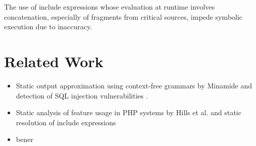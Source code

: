 \documentclass{sig-alternate-05-2015}
\begin{document}
\begin{framed}
\textcolor{RYB1}{The use of include expressions whose evaluation at runtime
involves concatenation, especially of fragments from critical sources, impede
symbolic execution due to inaccuracy.}
\end{framed}





\section{Related Work}
\begin{itemize}
  \item Static output approximation using context-free grammars
  by Minamide \cite{minamide2005static} and detection of SQL
  injection vulnerabilities \cite{wassermann2007sound}.
  \item Static analysis of feature usage in PHP systems by Hills et al.
  \cite{Hills:2013:ESP:2483760.2483786} and static resolution of include
  expressions \cite{Hills:2013:ESP:2483760.2483786,hills2014static}
  \item bener \cite{King1976} \cite{multiSE}
\end{itemize}










\newpage

%
%
\end{document}
